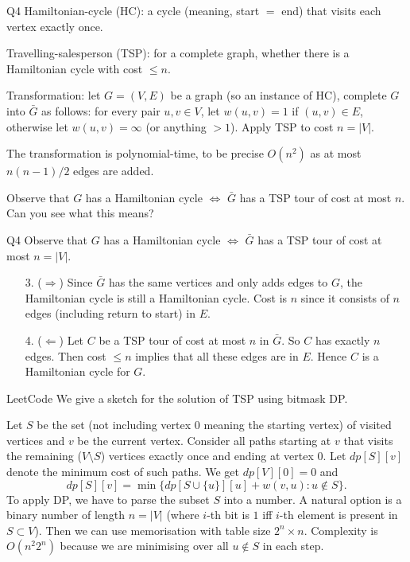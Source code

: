 \documentclass[t]{beamer}
\def\le{\leqslant}
\begin{document}
\begin{frame}{Q4}
  Hamiltonian-cycle (HC): a cycle (meaning, start $=$ end) that visits each vertex exactly once. 
  \par Travelling-salesperson (TSP): for a complete graph, whether there is a Hamiltonian cycle with cost $\le n$. 
  \par Transformation: let $G = (V, E)$ be a graph (so an instance of HC), complete $G$ into $\bar{G}$ as follows: for every pair $u, v \in V$, let $w(u, v) = 1$ if $(u, v) \in E$, otherwise let $w(u, v) = \infty$ (or anything $>1$). Apply TSP to cost $n = |V|$. 
  \par The transformation is polynomial-time, to be precise $O(n^2)$ as at most $n(n-1)/2$ edges are added. 
  \par Observe that $G$ has a Hamiltonian cycle $\iff$ $\bar{G}$ has a TSP tour of cost at most $n$. Can you see what this means? %
\end{frame}
\begin{frame}{Q4}
  Observe that $G$ has a Hamiltonian cycle $\iff$ $\bar{G}$ has a TSP tour of cost at most $n = |V|$.
  \begin{enumerate}
    \item [3.] ($\Rightarrow$) Since $\bar{G}$ has the same vertices and only adds edges to $G$, the Hamiltonian cycle is still a Hamiltonian cycle. Cost is $n$ since it consists of $n$ edges (including return to start) in $E$. 
    \item [4.] ($\Leftarrow$) Let $C$ be a TSP tour of cost at most $n$ in $\bar{G}$. So $C$ has exactly $n$ edges. Then cost $\le n$ implies that all these edges are in $E$. Hence $C$ is a Hamiltonian cycle for $G$. 
  \end{enumerate}
\end{frame}
\begin{frame}{LeetCode}
  We give a sketch for the solution of TSP using bitmask DP. 
  \par Let $S$ be the set (not including vertex $0$ meaning the starting vertex) of visited vertices and $v$ be the current vertex. Consider all paths starting at $v$ that visits the remaining ($V \setminus S$) vertices exactly once and ending at vertex $0$. Let $dp[S][v]$ denote the minimum cost of such paths.  We get $dp[V][0]=0$ and 
  \[dp[S][v] = \min\{dp[S \cup \{u\}][u]+w(v, u): u \notin S\}.\]
  To apply DP, we have to parse the subset $S$ into a number. A natural option is a binary number of length $n=|V|$ (where $i$-th bit is $1$ iff $i$-th element is present in $S \subset V$). Then we can use memorisation with table size $2^n \times n$. Complexity is $O(n^2 2^n)$ because we are minimising over all $u \notin S$ in each step. 
\end{frame}
\end{document}

